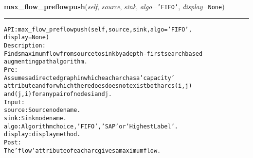 \hspace{.8\funcindent}\begin{boxedminipage}{\funcwidth}

    \raggedright \textbf{max\_flow\_preflowpush}(\textit{self}, \textit{source}, \textit{sink}, \textit{algo}={\tt \texttt{'}\texttt{FIFO}\texttt{'}}, \textit{display}={\tt None})

    \vspace{-1.5ex}

    \rule{\textwidth}{0.5\fboxrule}
\setlength{\parskip}{2ex}
\begin{alltt}

API: max\_flow\_preflowpush(self, source, sink, algo = 'FIFO',
                          display = None)
Description:
Finds maximum flow from source to sink by a depth-first search based
augmenting path algorithm.
Pre:
     Assumes a directed graph in which each arc has a 'capacity'
     attribute and for which there does does not exist both arcs (i,j)
     and (j,i) for any pair of nodes i and j.
Input:
    source: Source node name.
    sink: Sink node name.
    algo: Algorithm choice, 'FIFO', 'SAP' or 'HighestLabel'.
    display: display method.
Post:
    The 'flow' attribute of each arc gives a maximum flow.
\end{alltt}

\setlength{\parskip}{1ex}
    \end{boxedminipage}

    \label{coinor:gimpy:graph:Graph:min_cost_flow}

    \vspace{0.5ex}

